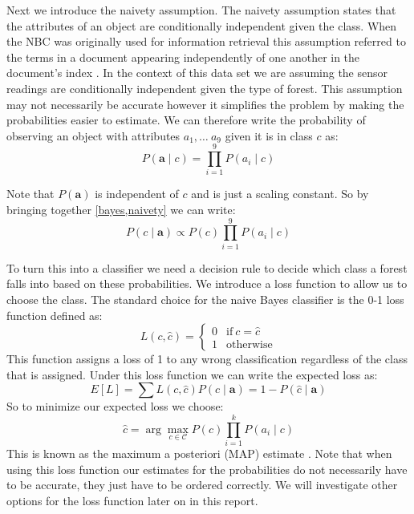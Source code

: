 Next we introduce the naivety assumption.
The naivety assumption states that the attributes of an object are conditionally independent given the class.
When the NBC was originally used for information retrieval this assumption referred to the terms in a document appearing independently of one another in the document's index \cite{Maron60}.
In the context of this data set we are assuming the sensor readings are conditionally independent given the type of forest.
This assumption may not necessarily be accurate however it simplifies the problem by making the probabilities easier to estimate.
We can therefore write the probability of observing an object with attributes $a_1, \dots\ a_9$ given it is in class $c$ as:
\begin{equation} \label{naivety}
	P(\mathbf{a} \mid c) = \prod_{i=1}^9 P(a_i \mid c)
\end{equation}

Note that $P(\mathbf{a})$ is independent of $c$ and is just a scaling constant.
So by bringing together \cref{bayes,naivety} we can write:
\begin{equation}
	P(c \mid \mathbf{a}) \propto P(c)\prod_{i=1}^{9}P(a_i \mid c)
\end{equation}

To turn this into a classifier we need a decision rule to decide which class a forest falls into based on these probabilities.
We introduce a loss function to allow us to choose the class.
The standard choice for the naive Bayes classifier is the 0-1 loss function \cite{Rish01} defined as:
\begin{equation}\label{0-1_loss_function}
	L(c, \hat{c}) = 
	\begin{cases}
		0 & \text{if}\ c = \hat{c} \\
		1 & \text{otherwise}
	\end{cases}
\end{equation}
This function assigns a loss of 1 to any wrong classification regardless of the class that is assigned. 
Under this loss function we can write the expected loss as:
\begin{equation}
	E[L] = \sum L(c, \hat{c})P(c \mid \mathbf{a}) = 1 - P(\hat{c} \mid \mathbf{a})
\end{equation}
So to minimize our expected loss we choose:
\begin{equation} \label{map_estimate}
	\hat c = \arg\max_{c \in \mathcal{C}} P(c)\prod_{i=1}^{k}P(a_i \mid c)
\end{equation}
This is known as the maximum a posteriori (MAP) estimate \cite{Jermyn15}.
Note that when using this loss function our estimates for the probabilities do not necessarily have to be accurate, they just have to be ordered correctly.
We will investigate other options for the loss function later on in this report.

